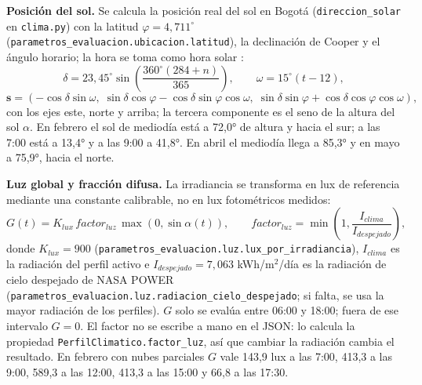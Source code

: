 \documentclass[12pt,a4paper]{article}
\newcommand{\codigo}[1]{\texttt{#1}}
\begin{document}
\textbf{Posición del sol.} Se calcula la posición real del sol en Bogotá (\codigo{direccion\_solar} en \codigo{clima.py}) con la latitud $\varphi=4,711^\circ$ (\codigo{parametros\_evaluacion.ubicacion.latitud}), la declinación de Cooper \cite{cooper1969} y el ángulo horario; la hora se toma como hora solar \cite{duffieBeckman,noaaSolcalc}:
\begin{equation}
 \delta=23,45^\circ\sin\left(\frac{360^\circ(284+n)}{365}\right),\qquad
 \omega=15^\circ(t-12),
 \label{eq:declinacion}
\end{equation}
\begin{equation}
 \mathbf s=\left(-\cos\delta\sin\omega,\;
 \sin\delta\cos\varphi-\cos\delta\sin\varphi\cos\omega,\;
 \sin\delta\sin\varphi+\cos\delta\cos\varphi\cos\omega\right),
 \label{eq:sol}
\end{equation}
con los ejes este, norte y arriba; la tercera componente es el seno de la altura del sol $\alpha$. En febrero el sol de mediodía está a 72,0° de altura y hacia el sur; a las 7:00 está a 13,4° y a las 9:00 a 41,8°. En abril el mediodía llega a 85,3° y en mayo a 75,9°, hacia el norte.

\textbf{Luz global y fracción difusa.} La irradiancia se transforma en lux de referencia mediante una constante calibrable, no en lux fotométricos medidos:
\begin{equation}
 G(t)=K_{lux}\,factor_{luz}\,\max(0,\sin\alpha(t)),\qquad
 factor_{luz}=\min\left(1,\frac{I_{clima}}{I_{despejado}}\right),
 \label{eq:clima}
\end{equation}
donde $K_{lux}=900$ (\codigo{parametros\_evaluacion.luz.lux\_por\_irradiancia}), $I_{clima}$ es la radiación del perfil activo e $I_{despejado}=7,063$ kWh/m$^2$/día es la radiación de cielo despejado de NASA POWER (\codigo{parametros\_evaluacion.luz.radiacion\_cielo\_despejado}; si falta, se usa la mayor radiación de los perfiles). $G$ solo se evalúa entre 06:00 y 18:00; fuera de ese intervalo $G=0$. El factor no se escribe a mano en el JSON: lo calcula la propiedad \codigo{PerfilClimatico.factor\_luz}, así que cambiar la radiación cambia el resultado. En febrero con nubes parciales $G$ vale 143,9 lux a las 7:00, 413,3 a las 9:00, 589,3 a las 12:00, 413,3 a las 15:00 y 66,8 a las 17:30.
\end{document}
